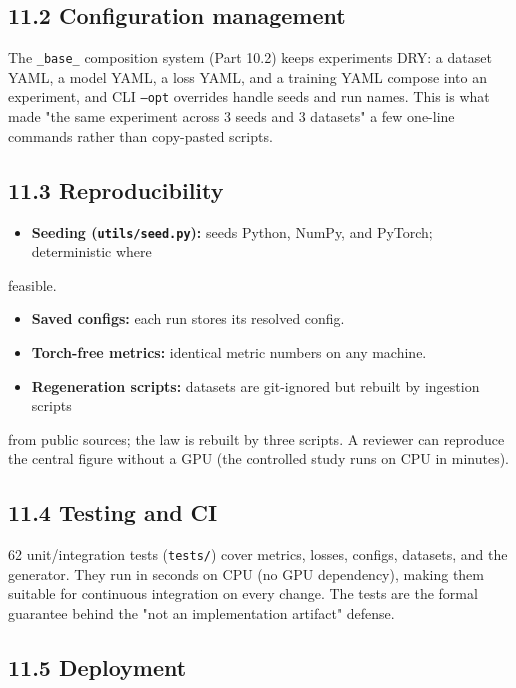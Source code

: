 \documentclass[11pt]{article}
\begin{document}
\subsection*{11.2 Configuration management}

The \texttt{\_base\_} composition system (Part 10.2) keeps experiments DRY: a dataset YAML, a model YAML, a loss YAML, and a training YAML compose into an experiment, and CLI \texttt{--opt} overrides handle seeds and run names. This is what made "the same experiment across 3 seeds and 3 datasets" a few one-line commands rather than copy-pasted scripts.

\subsection*{11.3 Reproducibility}

\begin{itemize}\setlength{\itemsep}{1pt}
\item \textbf{Seeding (\texttt{utils/seed.py}):} seeds Python, NumPy, and PyTorch; deterministic where
\end{itemize}
  feasible.
\begin{itemize}\setlength{\itemsep}{1pt}
\item \textbf{Saved configs:} each run stores its resolved config.
\item \textbf{Torch-free metrics:} identical metric numbers on any machine.
\item \textbf{Regeneration scripts:} datasets are git-ignored but rebuilt by ingestion scripts
\end{itemize}
  from public sources; the law is rebuilt by three scripts. A reviewer can reproduce   the central figure without a GPU (the controlled study runs on CPU in minutes).

\subsection*{11.4 Testing and CI}

62 unit/integration tests (\texttt{tests/}) cover metrics, losses, configs, datasets, and the generator. They run in seconds on CPU (no GPU dependency), making them suitable for continuous integration on every change. The tests are the formal guarantee behind the "not an implementation artifact" defense.

\subsection*{11.5 Deployment}
\end{document}
